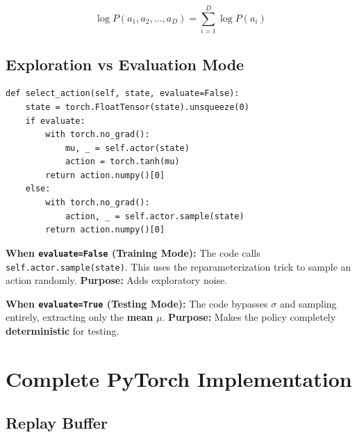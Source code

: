 \documentclass[12pt,a4paper]{article}
\theoremstyle{noteplain}
\theoremstyle{noteexercise}
\begin{document}
$$\log P(a_1, a_2, \ldots, a_D) = \sum_{i=1}^{D} \log P(a_i)$$



\subsection{Exploration vs Evaluation Mode}\label{ssec:explore-eval}



\begin{darkbox}
\begin{verbatim}
def select_action(self, state, evaluate=False):
    state = torch.FloatTensor(state).unsqueeze(0)
    if evaluate:
        with torch.no_grad():
            mu, _ = self.actor(state)
            action = torch.tanh(mu)
        return action.numpy()[0]
    else:
        with torch.no_grad():
            action, _ = self.actor.sample(state)
        return action.numpy()[0]
\end{verbatim}
\end{darkbox}

\textbf{When \texttt{evaluate=False} (Training Mode):} The code calls \texttt{self.actor.sample(state)}. This uses the reparameterization trick to sample an action randomly. \textbf{Purpose:} Adds exploratory noise.

\textbf{When \texttt{evaluate=True} (Testing Mode):} The code bypasses $\sigma$ and sampling entirely, extracting only the \textbf{mean} $\mu$. \textbf{Purpose:} Makes the policy completely \textbf{deterministic} for testing.






\section{Complete PyTorch Implementation}\label{sec:pytorch}



\subsection{Replay Buffer}\label{ssec:replay-buffer}
\end{document}
